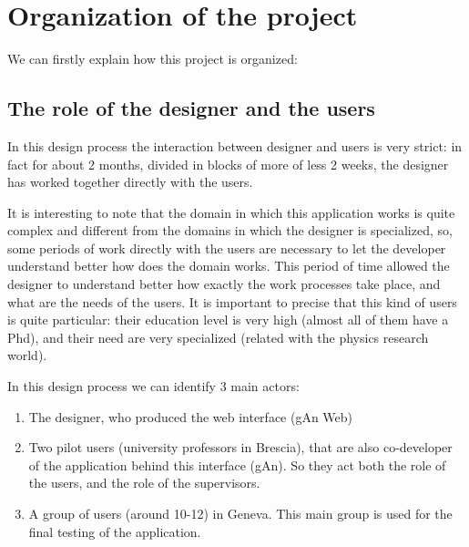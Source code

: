 
\chapter{Organization of the project} %

\label{Chapter2} %


We can firstly explain how this project is organized:

\section{The role of the designer and the users}
In this design process the interaction between designer and users is very strict: in fact for about 2 months, divided in blocks of more of less 2 weeks, the designer has worked together directly with the users. 

It is interesting to note that the domain in which this application works is quite complex and different from the domains in which the designer is specialized, so, some periods of work directly with the users are necessary to let the developer understand better how does the domain works.
This period of time allowed the designer to understand better how exactly the work processes take place, and what are the needs of the users. 
It is important to precise that this kind of users is quite particular: their education level is very high (almost all of them have a Phd), and their need are very specialized (related with the physics research world).

In this design process we can identify 3 main actors: 
\begin{enumerate}

\item
The designer, who produced the web interface (gAn Web)

\item 
Two pilot users (university professors in Brescia), that are also co-developer of the application behind this interface (gAn). So they act both the role of the users, and the role of the supervisors. 

\item A group of users (around 10-12) in Geneva. This main group is used for the final testing of the application.
 
\end{enumerate}

